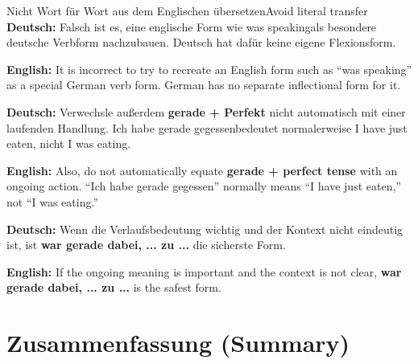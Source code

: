 \documentclass[a4paper,11pt]{article}
\newcommand{\GermanText}[1]{\textbf{Deutsch: }#1\par}
\newcommand{\EnglishText}[1]{{\small\color{SoftGray}\textbf{English: }#1\par}}
\begin{document}
        \begin{grammarentry}{Nicht Wort für Wort aus dem Englischen übersetzen}{Avoid literal transfer}
            \GermanText{Falsch ist es, eine englische Form wie \glqq was speaking\grqq als besondere deutsche Verbform nachzubauen. Deutsch hat dafür keine eigene Flexionsform.}
            \EnglishText{It is incorrect to try to recreate an English form such as ``was speaking'' as a special German verb form. German has no separate inflectional form for it.}

            \GermanText{Verwechsle außerdem \textbf{gerade + Perfekt} nicht automatisch mit einer laufenden Handlung. \glqq Ich habe gerade gegessen\grqq bedeutet normalerweise \glqq I have just eaten\grqq, nicht \glqq I was eating\grqq.}
            \EnglishText{Also, do not automatically equate \textbf{gerade + perfect tense} with an ongoing action. ``Ich habe gerade gegessen'' normally means ``I have just eaten,'' not ``I was eating.''}

            \GermanText{Wenn die Verlaufsbedeutung wichtig und der Kontext nicht eindeutig ist, ist \textbf{war gerade dabei, ... zu ...} die sicherste Form.}
            \EnglishText{If the ongoing meaning is important and the context is not clear, \textbf{war gerade dabei, ... zu ...} is the safest form.}
        \end{grammarentry}

    \section{Zusammenfassung \textnormal{(Summary)}}
\end{document}
